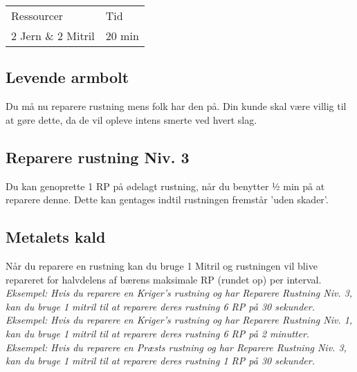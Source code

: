 \begin{table}[H]
    \centering
    \begin{tabular}{|p{}|p{}|}
    \hline
    \rowcolor{cerulean!80}
    \multicolumn{2}{c}{Lås Niv. 3}\\
    \hline
    \rowcolor{cerulean!40}
         Ressourcer & Tid \\\hline
         2 Jern \& 2 Mitril & 20 min\\\hline
    \end{tabular}
    \end{table}
    
\subsection{Levende armbolt}
Du må nu reparere rustning mens folk har den på. Din kunde skal være villig til at gøre dette, da de vil opleve intens smerte ved hvert slag.

\subsection{Reparere rustning Niv. 3}
Du kan genoprette 1 RP på ødelagt rustning, når du benytter ½ min på at reparere denne. Dette kan gentages indtil rustningen fremstår 'uden skader'.\\

\subsection{Metalets kald}
Når du reparere en rustning kan du bruge 1 Mitril og rustningen vil blive repareret for halvdelens af bærens maksimale RP (rundet op) per interval.\\
\textit{Eksempel: Hvis du reparere en Kriger's rustning og har Reparere Rustning Niv. 3, kan du bruge 1 mitril til at reparere deres rustning 6 RP på 30 sekunder.}
\textit{Eksempel: Hvis du reparere en Kriger's rustning og har Reparere Rustning Niv. 1, kan du bruge 1 mitril til at reparere deres rustning 6 RP på 2 minutter.}
\textit{Eksempel: Hvis du reparere en Præsts rustning og har Reparere Rustning Niv. 3, kan du bruge 1 mitril til at reparere deres rustning 1 RP på 30 sekunder.}

